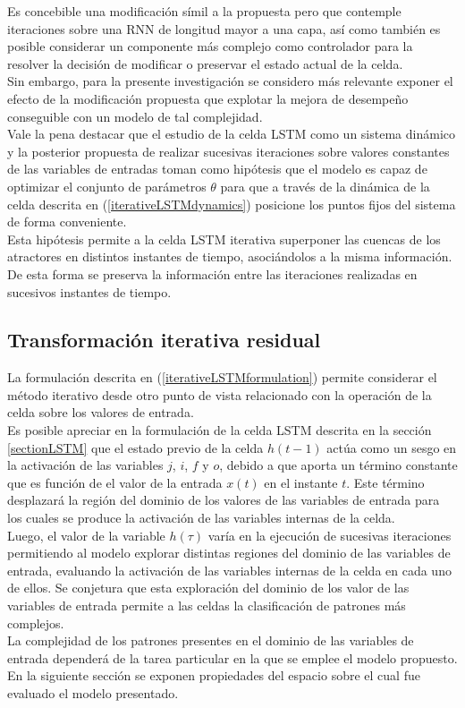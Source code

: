 \documentclass{article}
\begin{document}
	Es concebible una modificación símil a la propuesta pero que contemple iteraciones sobre una RNN de longitud mayor a una capa, así como también es posible considerar un componente más complejo como controlador para la resolver la decisión de modificar o preservar el estado actual de la celda.\\
	Sin embargo, para la presente investigación se considero más relevante exponer el efecto de la modificación propuesta que explotar la mejora de desempeño conseguible con un modelo de tal complejidad.\\
	
	Vale la pena destacar que el estudio de la celda LSTM como un sistema dinámico y la posterior propuesta de realizar sucesivas iteraciones sobre valores constantes de las variables de entradas toman como hipótesis que el modelo es capaz de optimizar el conjunto de parámetros $\theta$ para que a través de la dinámica de la celda descrita en (\ref{iterativeLSTMdynamics}) posicione los puntos fijos del sistema de forma conveniente.\\
	Esta hipótesis permite a la celda LSTM iterativa superponer las cuencas de los atractores en distintos instantes de tiempo, asociándolos a la misma información. De esta forma se preserva la información entre las iteraciones realizadas en sucesivos instantes de tiempo.
	
	
	\subsection{Transformación iterativa residual}
	La formulación descrita en (\ref{iterativeLSTMformulation}) permite considerar el método iterativo desde otro punto de vista relacionado con la operación de la celda sobre los valores de entrada.\\
	Es posible apreciar en la formulación de la celda LSTM descrita en la sección \ref{sectionLSTM} que el estado previo de la celda $h(t-1)$ actúa como un sesgo en la activación de las variables $j$, $i$, $f$ y $o$, debido a que aporta un término constante que es función de el valor de la entrada $x(t)$ en el instante $t$. Este término desplazará la región del dominio de los valores de las variables de entrada para los cuales se produce la activación de las variables internas de la celda.\\
	Luego, el valor de la variable $h(\tau)$ varía en la ejecución de sucesivas iteraciones permitiendo al modelo explorar distintas regiones del dominio de las variables de entrada, evaluando la activación de las variables internas de la celda en cada uno de ellos. Se conjetura que esta exploración del dominio de los valor de las variables de entrada permite a las celdas la clasificación de patrones más complejos.\\
	La complejidad de los patrones presentes en el dominio de las variables de entrada dependerá de la tarea particular en la que se emplee el modelo propuesto. En la siguiente sección se exponen propiedades del espacio sobre el cual fue evaluado el modelo presentado.\\
	
\end{document}
